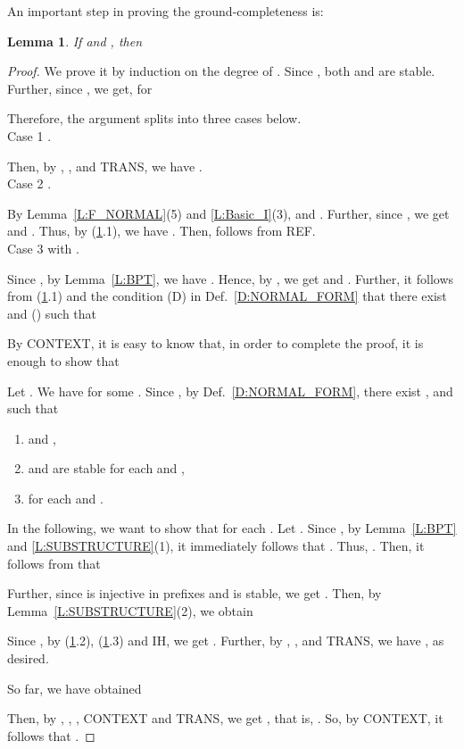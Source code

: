 \documentclass{elsarticle}
\theoremstyle{plain}
\newtheorem{lemma}[theorem]{Lemma}
\theoremstyle{definition}
\begin{document}
An important step in proving the ground-completeness is:

\begin{lemma}\label{L:COMPLETENESS}
  If  and , then 
\end{lemma}
\begin{proof}
    We prove it by induction on the degree of .
    Since , both  and  are stable. Further, since , we get, for 

    

    Therefore, the argument splits into three cases below.\\

\noindent Case 1 .

        Then, by , ,  and TRANS, we have .\\

\noindent Case 2 .

       By Lemma~\ref{L:F_NORMAL}(5) and \ref{L:Basic_I}(3),  and . Further, since , we get  and . Thus, by (\ref{L:COMPLETENESS}.1), we have . Then,  follows from REF.\\

\noindent Case 3  with .

        Since , by Lemma~\ref{L:BPT}, we have .
        Hence, by ,  we get  and .
        Further, it follows from (\ref{L:COMPLETENESS}.1) and the condition (D) in Def.~\ref{D:NORMAL_FORM} that
        there exist  and () such that
         
       By CONTEXT, it is easy to know that, in order to complete the proof, it is enough to show that
       
    Let . We have  for some .
    Since , by Def.~\ref{D:NORMAL_FORM}, there exist ,  and  such that
    \begin{enumerate}
      \item  and ,
      \item  and  are stable for each  and ,
      \item  for each  and .
    \end{enumerate}
    In the following, we want to show that  for each .
     Let .
     Since , by Lemma~\ref{L:BPT} and \ref{L:SUBSTRUCTURE}(1), it immediately follows that .
    Thus, .
    Then, it follows from   that
    
    Further, since  is injective in prefixes and  is stable, we get .
    Then, by Lemma~\ref{L:SUBSTRUCTURE}(2), we obtain
    
    Since , by (\ref{L:COMPLETENESS}.2), (\ref{L:COMPLETENESS}.3) and IH, we get .
    Further, by , ,  and TRANS, we have , as desired.

    So far, we have obtained
    
    Then, by , , , CONTEXT and TRANS, we get , that is, .
    So, by CONTEXT, it follows that .
\end{proof}
\end{document}
